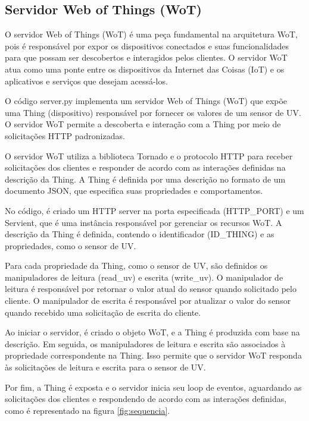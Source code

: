 \subsection{Servidor Web of Things (WoT)}

O servidor Web of Things (WoT) é uma peça fundamental na arquitetura WoT, pois é responsável por expor os dispositivos conectados e suas funcionalidades para que possam ser descobertos e interagidos pelos clientes. O servidor WoT atua como uma ponte entre os dispositivos da Internet das Coisas (IoT) e os aplicativos e serviços que desejam acessá-los.

O código server.py  implementa um servidor Web of Things (WoT) que expõe uma Thing (dispositivo) responsável por fornecer os valores de um sensor de UV. O servidor WoT permite a descoberta e interação com a Thing por meio de solicitações HTTP padronizadas.

O servidor WoT utiliza a biblioteca Tornado e o protocolo HTTP para receber solicitações dos clientes e responder de acordo com as interações definidas na descrição da Thing. A Thing é definida por uma descrição no formato de um documento JSON, que especifica suas propriedades e comportamentos.

No código, é criado um HTTP server na porta especificada (HTTP\_PORT) e um Servient, que é uma instância responsável por gerenciar os recursos WoT. A descrição da Thing é definida, contendo o identificador (ID\_THING) e as propriedades, como o sensor de UV.

Para cada propriedade da Thing, como o sensor de UV, são definidos os manipuladores de leitura (read\_uv) e escrita (write\_uv). O manipulador de leitura é responsável por retornar o valor atual do sensor quando solicitado pelo cliente. O manipulador de escrita é responsável por atualizar o valor do sensor quando recebido uma solicitação de escrita do cliente.

Ao iniciar o servidor, é criado o objeto WoT, e a Thing é produzida com base na descrição. Em seguida, os manipuladores de leitura e escrita são associados à propriedade correspondente na Thing. Isso permite que o servidor WoT responda às solicitações de leitura e escrita para o sensor de UV.

Por fim, a Thing é exposta e o servidor inicia seu loop de eventos, aguardando as solicitações dos clientes e respondendo de acordo com as interações definidas, como é representado na figura \ref{fig:sequencia}.


